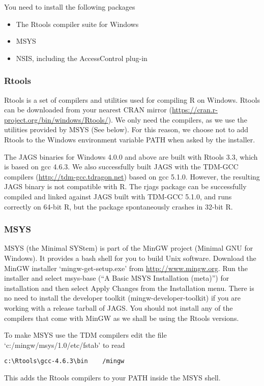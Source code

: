 \documentclass[11pt, a4paper, titlepage]{article}
\newcommand{\JAGS}{\textsf{JAGS}}
\newcommand{\code}[1]{{\bgroup{\normalfont\ttfamily #1}\egroup}}
\newcommand{\file}[1]{{`\normalfont\textsf{#1}'}}
\begin{document}
You need to install the following packages
\begin{itemize}
\item The Rtools compiler suite for Windows
\item MSYS  
\item NSIS, including the AccessControl plug-in  
\end{itemize}

\subsubsection{Rtools}

Rtools is a set of compilers and utilities used for compiling R on
Windows. Rtools can be downloaded from your nearest CRAN mirror
(\url{https://cran.r-project.org/bin/windows/Rtools/}).  We only need
the compilers, as we use the utilities provided by MSYS (See below).
For this reason, we choose not to add Rtools to the Windows environment
variable \code{PATH} when asked by the installer.

The JAGS binaries for Windows 4.0.0 and above are built with Rtools
3.3, which is based on gcc 4.6.3. We also successfully built JAGS with
the TDM-GCC compilers (\url{http://tdm-gcc.tdragon.net}) based on gcc
5.1.0. However, the resulting JAGS binary is not compatible with
R. The rjags package can be successfully compiled and linked against
JAGS built with TDM-GCC 5.1.0, and runs correctly on 64-bit R, but
the package spontaneously crashes in 32-bit R.

\subsubsection{MSYS}

MSYS (the Minimal SYStem) is part of the MinGW project (Minimal GNU
for Windows). It provides a bash shell for you to build Unix
software. Download the MinGW installer \file{mingw-get-setup.exe} from
\url{http://www.mingw.org}.  Run the installer and select
\code{msys-base} (``A Basic MSYS Installation (meta)'') for
installation and then select \code{Apply Changes} from the
\code{Installation} menu. There is no need to install the developer
toolkit (\code{mingw-developer-toolkit}) if you are working with a
release tarball of \JAGS.  You should not install any of the compilers
that come with MinGW as we shall be using the Rtools versions.

To make MSYS use the TDM compilers edit the file
\file{c:/mingw/msys/1.0/etc/fstab} to read
\begin{verbatim}
c:\Rtools\gcc-4.6.3\bin    /mingw
\end{verbatim}
This adds the Rtools compilers to your PATH inside the MSYS shell.
\end{document}
